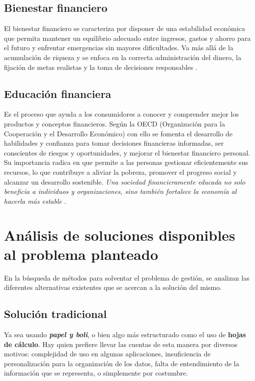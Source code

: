 \subsection*{Bienestar financiero}
El bienestar financiero se caracteriza por disponer de una estabilidad económica que 
permita mantener un equilibrio adecuado entre ingresos, gastos y ahorro para el futuro 
y enfrentar emergencias sin mayores dificultades. Va más allá de la acumulación de 
riqueza y se enfoca en la correcta administración del dinero, la fijación de metas 
realistas y la toma de decisiones responsables \cite{tesis-cultura-financiera}.

\subsection*{Educación financiera}
Es el proceso que ayuda a los consumidores a conocer y 
comprender mejor los productos y conceptos financieros. Según la OECD (Organización para la Cooperación y el Desarrollo Económico) con ello se fomenta el 
desarrollo de habilidades y confianza para tomar decisiones financieras informadas, ser conscientes de riesgos y oportunidades, y mejorar el bienestar financiero personal. Su importancia radica en que permite a las personas gestionar eficientemente sus recursos, lo que contribuye a aliviar la pobreza, promover el progreso social y alcanzar un desarrollo sostenible. \textit{Una sociedad financieramente educada no solo beneficia a individuos y organizaciones, sino también fortalece la economía al hacerla más estable} \cite{capituloIX}\cite{ariza2024educacion}\cite{sarango2023educacion}.



\section{Análisis de soluciones disponibles al problema planteado}

En la búsqueda de métodos para solventar el problema de gestión, se analizan las diferentes alternativas existentes que se acercan a la solución del mismo.

\subsection{Solución tradicional}
Ya sea usando \textit{\textbf{papel y boli}}, o bien algo más 
estructurado como el uso de \textbf{hojas de cálculo}. Hay quien prefiere llevar las 
cuentas de esta manera por diversos motivos: complejidad de uso en algunas aplicaciones, 
insuficiencia de personalización para la organización de los datos, falta de entendimiento 
de la información que se representa, o simplemente por costumbre.

